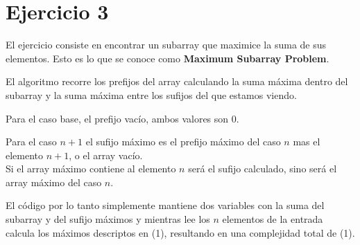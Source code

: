 \section{Ejercicio 3}

El ejercicio consiste en encontrar un subarray que maximice la suma de sus elementos. Esto es lo que se conoce como \textbf{Maximum Subarray Problem}.

El algoritmo recorre los prefijos del array calculando la suma máxima dentro del subarray y la suma máxima entre los sufijos del que estamos viendo.

Para el caso base, el prefijo vacío, ambos valores son 0.

Para el caso $n+1$ el sufijo máximo es el prefijo máximo del caso $n$ mas el elemento $n+1$, o el array vacío. \\
Si el array máximo contiene al elemento $n$ será el sufijo calculado, sino será el array máximo del caso $n$.

El código por lo tanto simplemente mantiene dos variables con la suma del subarray y del sufijo máximos y mientras lee los $n$ elementos de la entrada calcula los máximos descriptos en \bigo(1), resultando en una complejidad total de \bigo(1).

